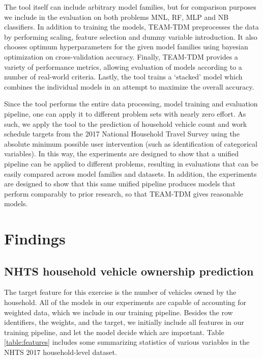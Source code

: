 \documentclass[numbered]{trbunofficial}
\begin{document}
The tool itself can include arbitrary model families, but for comparison purposes we include in the evaluation on both problems MNL, RF, MLP and NB classifiers.
 In addition to training the models, TEAM-TDM preprocesses the data by performing scaling, feature selection and dummy variable introduction.
 It also chooses optimum hyperparameters for the given model families using bayesian optimization on cross-validation accuracy.
 Finally, TEAM-TDM provides a variety of performance metrics, allowing evaluation of models according to a number of real-world criteria.
 Lastly, the tool trains a `stacked' model which combines the individual models in an attempt to maximize the overall accuracy.

Since the tool performs the entire data processing, model training and evaluation pipeline, one can apply it to different problem sets with nearly zero effort.
 As such, we apply the tool to the prediction of household vehicle count and work schedule targets from the 2017 National Household Travel Survey using the absolute minimum possible user intervention (such as identification of categorical variables).
 In this way, the experiments are designed to show that a unified pipeline can be applied to different problems, resulting in evaluations that can be easily compared across model families and datasets.
 In addition, the experiments are designed to show that this same unified pipeline produces models that perform comparably to prior research, so that TEAM-TDM gives reasonable models.

\section{Findings} \label{section:results}

\subsection{NHTS household vehicle ownership prediction}\label{subsection:vehicle}

The target feature for this exercise is the number of vehicles owned by the household.
 All of the models in our experiments are capable of accounting for weighted data, which we include in our training pipeline.
 Besides the row identifiers, the weights, and the target, we initially include all features in our training pipeline, and let the model decide which are important.
 Table \ref{table:features} includes some summarizing statistics of various variables in the NHTS 2017 household-level dataset.
\end{document}
